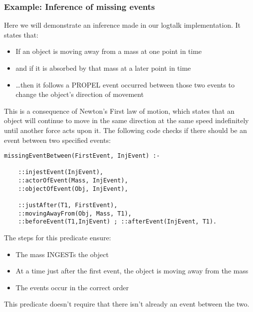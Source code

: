 \documentclass[report]{subfiles}
\begin{document}
\subsubsection{Example: Inference of missing events}
\label{logtalkinference}

Here we will demonstrate an inference made in our logtalk implementation. It states that:
\begin{itemize}
    \item If an object is moving away from a mass at one point in time
    \item and if it is absorbed by that mass at a later point in time
    \item \ldots then it follows a PROPEL event occurred between those two events to change the object's direction of movement
\end{itemize}
This is a consequence of Newton's First law of motion, which states that an object will continue to move in the same direction at the same speed indefinitely until another force acts upon it. The following code checks if there should be an event between two specified events:

\begin{lstlisting}
missingEventBetween(FirstEvent, InjEvent) :-

    ::injestEvent(InjEvent),
    ::actorOfEvent(Mass, InjEvent),
    ::objectOfEvent(Obj, InjEvent),

    ::justAfter(T1, FirstEvent),
    ::movingAwayFrom(Obj, Mass, T1),
    ::beforeEvent(T1,InjEvent) ; ::afterEvent(InjEvent, T1).
\end{lstlisting}

The steps for this predicate ensure:
\begin{itemize}
    \item The mass INGESTs the object 
    \item At a time just after the first event, the object is moving away from the mass
    \item The events occur in the correct order
\end{itemize}

This predicate doesn't require that there isn't already an event between the two.
\end{document}
